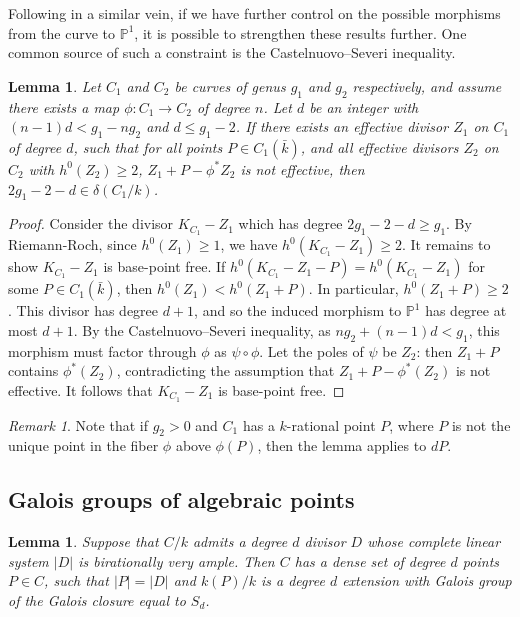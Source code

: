 \documentclass[a4paper,11pt]{amsart}
\theoremstyle{plain}
\newtheorem{lemma}[thm]{Lemma}
\theoremstyle{remark}
\newtheorem{remark}[thm]{Remark}
\newcommand{\dendegs}{\delta}
\begin{document}
Following in a similar vein, if we have further control on the possible morphisms from the curve to $\mathbb{P}^1$, it is possible to strengthen these results further. One common source of such a constraint is the Castelnuovo--Severi inequality.

\begin{lemma}\label{cs_asymptotic}
Let $C_1$ and $C_2$ be curves of genus $g_1$ and $g_2$ respectively, and assume there exists a map $\phi : C_1 \to C_2$ of degree $n$. 
Let $d$ be an integer with $(n - 1)d < g_1 - ng_2$ and $d \leq g_1 - 2$. 
If there exists an effective divisor $Z_1$ on $C_1$ of degree $d$, such that for all points $P \in C_1(\bar{k})$, and all effective divisors $Z_2$ on $C_2$ with $h^0(Z_2) \geq 2$, $Z_1 + P - \phi^* Z_2$ is not effective, then $2g_1 - 2 - d \in \dendegs(C_1 / k)$.
\end{lemma}
\begin{proof}
    Consider the divisor $K_{C_1} - Z_1$ which has degree $2g_1 - 2 - d \geq g_1$. 
    By Riemann-Roch, since $h^0(Z_1) \geq 1$, we have $h^0(K_{C_1} - Z_1) \geq 2$. 
    It remains to show $K_{C_1} - Z_1$ is base-point free. 
    If $h^0(K_{C_1} - Z_1 - P) = h^0(K_{C_1} - Z_1)$ for some $P \in C_1(\bar{k})$, then $h^0(Z_1) < h^0(Z_1 + P)$. 
    In particular, $h^0(Z_1 + P) \geq 2$. 
    This divisor has degree $d + 1$, and so the induced morphism to $\mathbb{P}^1$ has degree at most $d + 1$. 
    By the Castelnuovo--Severi inequality, as $ng_2 + (n - 1)d < g_1$, this morphism must factor through $\phi$ as $\psi \circ \phi$. 
    Let the poles of $\psi$ be $Z_2$: then $Z_1 + P$ contains $\phi^*(Z_2)$, contradicting the assumption that $Z_1 + P - \phi^*(Z_2)$ is not effective.
    It follows that $K_{C_1} - Z_1$ is base-point free.
\end{proof}

\begin{remark}\label{rmk:applicationofLemma2.5}
    Note that if $g_2 > 0$ and $C_1$ has a $k$-rational point $P$, where $P$ is not the unique point in the fiber $\phi$ above $\phi(P)$, then the lemma applies to $dP$.
\end{remark}

\subsection{Galois groups of algebraic points}


\begin{lemma}\label{lem:Sd_points}
    Suppose that \(C/k\) admits a degree \(d\) divisor \(D\) whose complete linear system \(|D|\) is birationally very ample.  Then \(C\) has a dense set of degree \(d\) points \(P \in C\), such that \(|P| = |D|\) and \(k(P)/k\) is a degree \(d\) extension with Galois group of the Galois closure equal to \(S_d\). 
\end{lemma}
\end{document}
